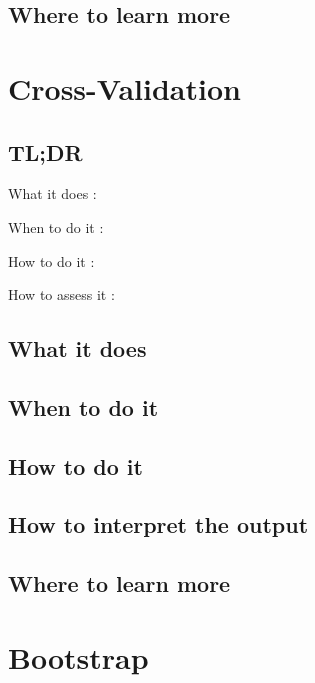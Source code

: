 \documentclass[
]{book}
\begin{document}
\hypertarget{where-to-learn-more-8}{%
\section{Where to learn more}\label{where-to-learn-more-8}}

\hypertarget{cross-validation}{%
\chapter{Cross-Validation}\label{cross-validation}}

\hypertarget{tldr-9}{%
\section{TL;DR}\label{tldr-9}}

What it does
:

When to do it
:

How to do it
:

How to assess it
:

\hypertarget{what-it-does-9}{%
\section{What it does}\label{what-it-does-9}}

\hypertarget{when-to-do-it-9}{%
\section{When to do it}\label{when-to-do-it-9}}

\hypertarget{how-to-do-it-9}{%
\section{How to do it}\label{how-to-do-it-9}}

\hypertarget{how-to-interpret-the-output-9}{%
\section{How to interpret the output}\label{how-to-interpret-the-output-9}}

\hypertarget{where-to-learn-more-9}{%
\section{Where to learn more}\label{where-to-learn-more-9}}

\hypertarget{bootstrap}{%
\chapter{Bootstrap}\label{bootstrap}}
\end{document}

